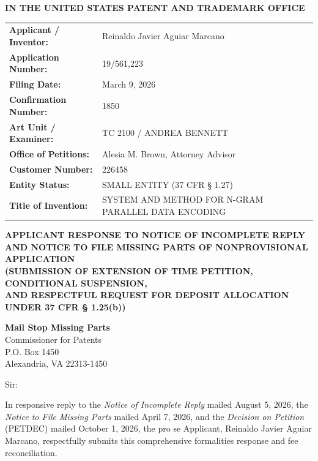 \documentclass[11pt,letterpaper]{article}
\begin{document}
\thispagestyle{empty}

\begin{center}
    \textbf{\large IN THE UNITED STATES PATENT AND TRADEMARK OFFICE}
\end{center}

\vspace{0.3cm}
\noindent\begin{tabular}{p{2.3in}p{4.0in}}
\textbf{Applicant / Inventor:} & Reinaldo Javier Aguiar Marcano \\
\textbf{Application Number:} & 19/561,223 \\
\textbf{Filing Date:} & March 9, 2026 \\
\textbf{Confirmation Number:} & 1850 \\
\textbf{Art Unit / Examiner:} & TC 2100 / ANDREA BENNETT \\
\textbf{Office of Petitions:} & Alesia M. Brown, Attorney Advisor \\
\textbf{Customer Number:} & 226458 \\
\textbf{Entity Status:} & SMALL ENTITY (37 CFR \S{} 1.27) \\
\textbf{Title of Invention:} & SYSTEM AND METHOD FOR N-GRAM PARALLEL DATA ENCODING \\
\end{tabular}

\vspace{0.4cm}
\begin{center}
    \textbf{\large APPLICANT RESPONSE TO NOTICE OF INCOMPLETE REPLY \\
    AND NOTICE TO FILE MISSING PARTS OF NONPROVISIONAL APPLICATION} \\
    \textbf{\normalsize (SUBMISSION OF EXTENSION OF TIME PETITION, CONDITIONAL SUSPENSION, \\
    AND RESPECTFUL REQUEST FOR DEPOSIT ALLOCATION UNDER 37 CFR \S{} 1.25(b))}
\end{center}

\noindent\textbf{Mail Stop Missing Parts} \\
Commissioner for Patents \\
P.O. Box 1450 \\
Alexandria, VA 22313-1450

\vspace{0.2cm}
Sir:

In responsive reply to the \textit{Notice of Incomplete Reply} mailed August 5, 2026, the \textit{Notice to File Missing Parts} mailed April 7, 2026, and the \textit{Decision on Petition} (PETDEC) mailed October 1, 2026, the pro se Applicant, Reinaldo Javier Aguiar Marcano, respectfully submits this comprehensive formalities response and fee reconciliation.
\end{document}

